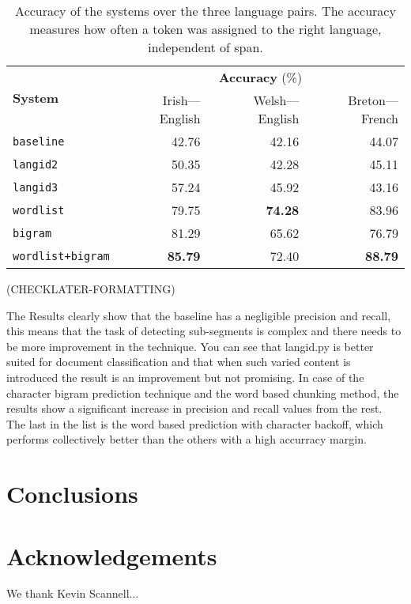 \documentclass[11pt]{article}
\begin{document}
\begin{table}
\begin{center}
\begin{tabular}{|l|r|r|r|}
\hline
\multirow{2}{*}{\textbf{System}} &  \multicolumn{3}{c|}{\textbf{Accuracy} (\%)} \\\cline{2-4}
       &   Irish---English & Welsh---English & Breton---French \\ 
\hline
\texttt{baseline} & 42.76 & 42.16 & 44.07 \\
\hline
\texttt{langid2} & 50.35 & 42.28 & 45.11  \\
\hline
\texttt{langid3} & 57.24 & 45.92 & 43.16 \\
\hline
\texttt{wordlist} & 79.75 & \textbf{74.28} & 83.96 \\
\hline
\texttt{bigram} & 81.29 & 65.62 & 76.79 \\
\hline
\texttt{wordlist+bigram} & \textbf{85.79} & 72.40 & \textbf{88.79} \\
\hline
\end{tabular}
\end{center}
\label{table:accuracy}
\caption{Accuracy of the systems over the three language pairs. The accuracy measures how often a token
  was assigned to the right language, independent of span.}
\end{table}


(CHECKLATER-FORMATTING)

The Results clearly show that the baseline has a negligible precision and recall, this means that the task of detecting sub-segments is complex and there needs to be more improvement in the technique. You can see that langid.py is better suited for document classification and that when such varied content is introduced the result is an improvement but not promising. In case of the character bigram prediction technique and the word based chunking method, the results show a significant increase in precision and recall values from the rest. The last in the list is the word based prediction with character backoff, which performs collectively better than the others with a high accurracy margin. \\


\section{Conclusions}
\label{sec:conclusions}



\section*{Acknowledgements}

We thank Kevin Scannell... 



\end{document}
